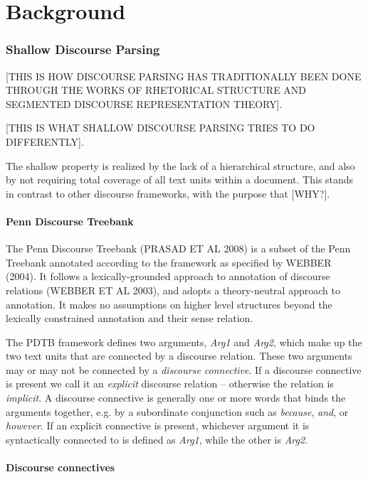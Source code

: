 \chapter{Background}

\subsection{Shallow Discourse Parsing}

[THIS IS HOW DISCOURSE PARSING HAS TRADITIONALLY BEEN DONE THROUGH THE WORKS OF RHETORICAL STRUCTURE AND SEGMENTED DISCOURSE REPRESENTATION THEORY].

[THIS IS WHAT SHALLOW DISCOURSE PARSING TRIES TO DO DIFFERENTLY].

The shallow property is realized by the lack of a hierarchical structure, and also by not requiring total coverage of all text units within a document. This stands in contrast to other discourse frameworks, with the purpose that [WHY?].

\subsubsection{Penn Discourse Treebank}

The Penn Discourse Treebank (PRASAD ET AL 2008) is a subset of the Penn Treebank annotated according to the framework as specified by WEBBER (2004).  It follows a lexically-grounded approach to annotation of discourse relations (WEBBER ET AL 2003), and adopts a theory-neutral approach to annotation. It makes no assumptions on higher level structures beyond the lexically constrained annotation and their sense relation.

The PDTB framework defines two arguments, \emph{Arg1} and \emph{Arg2}, which make up the two text units that are connected by a discourse relation. These two arguments may or may not be connected by a \emph{discourse connective}. If a discourse connective is present we call it an \emph{explicit} discourse relation -- otherwise the relation is \emph{implicit}. A discourse connective is generally one or more words that binds the arguments together, e.g. by a subordinate conjunction such as \emph{because}, \emph{and}, or \emph{however}. If an explicit connective is present, whichever argument it is syntactically connected to is defined as \emph{Arg1}, while the other is \emph{Arg2}.

\subsubsection{Discourse connectives}

